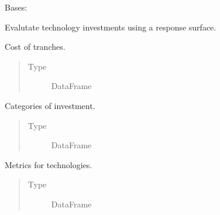 \documentclass[letterpaper,10pt,english]{sphinxmanual}
\begin{document}
\begin{fulllineitems}
\label{\detokenize{doc-src/tyche:tyche.Evaluator.Evaluator}}
Bases: 

Evalutate technology investments using a response surface.

\begin{fulllineitems}
\label{\detokenize{doc-src/tyche:tyche.Evaluator.Evaluator.amounts}}
Cost of tranches.
\begin{quote}\begin{description}
\item[{Type}] \leavevmode
DataFrame

\end{description}\end{quote}

\end{fulllineitems}


\begin{fulllineitems}
\label{\detokenize{doc-src/tyche:tyche.Evaluator.Evaluator.categories}}
Categories of investment.
\begin{quote}\begin{description}
\item[{Type}] \leavevmode
DataFrame

\end{description}\end{quote}

\end{fulllineitems}


\begin{fulllineitems}
\label{\detokenize{doc-src/tyche:tyche.Evaluator.Evaluator.metrics}}
Metrics for technologies.
\begin{quote}\begin{description}
\item[{Type}] \leavevmode
DataFrame


\end{description}
\end{quote}
\end{fulllineitems}
\end{fulllineitems}
\end{document}
